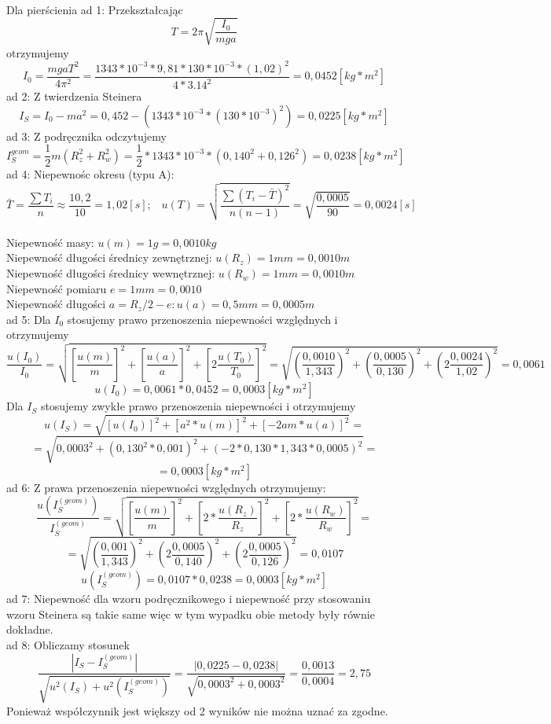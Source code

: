 \documentclass[a4paper,10pt,twoside]{article}
\begin{document}
\noindent
\\Dla pierścienia
\noindent
ad 1: Przekształcając 
$$
T = 2\pi\sqrt{\frac{I_0}{mga}}
$$
otrzymujemy
$$
I_0 = \frac{mgaT^2}{4\pi^2} = \frac{1343 * 10^{-3} * 9,81 * 130 * 10^{-3} * (1,02)^2}{4*3.14^2} = 0,0452[kg*m^2]
$$
ad 2: Z twierdzenia Steinera 
$$
I_S = I_0 - ma^2 = 0,452 - (1343*10^{-3}*(130*10^{-3})^2) = 0,0225[kg*m^2]
$$
ad 3: Z podręcznika odczytujemy $$I_S^{geom} = \frac{1}{2}m(R_z^2+ R_w^2) = \frac{1}{2}*1343*10^{-3}*(0,140^2 + 0,126^2) = 0,0238[kg*m^2]
$$
ad 4: Niepewnośc okresu (typu A): $$\bar{T} = \frac{\sum T_i}{n} \approx \frac{10,2}{10} = 1,02[s] ;\hspace{10pt} u(T) = \sqrt{\frac{\sum (T_i - \bar{T})^2}{n(n-1)}} = \sqrt{\frac{0,0005}{90}} = 0,0024[s] 
$$
\\ Niepewność masy: $u(m) = 1 g = 0,0010 kg$ 
\\ Niepewność długości średnicy zewnętrznej: $u(R_z) = 1 mm = 0,0010 m$
\\ Niepewność długości średnicy wewnętrznej:
 $u(R_w) = 1 mm = 0,0010 m$
\\Niepewność pomiaru $e = 1mm = 0,0010$
\\ Niepewność długości $a = R_z/2 - e: u(a) = 0,5mm = 0,0005 m$
\\ad 5: Dla $I_0$ stosujemy prawo przenoszenia niepewności względnych i otrzymujemy 
$$
\frac{u(I_0)}{I_0} = \sqrt{\left[\frac{u(m)}{m}\right]^2 + \left[\frac{u(a)}{a}\right]^2 + \left[2\frac{u(T_0)}{T_0}\right]^2} = \sqrt{\left(\frac{0,0010}{1,343}\right)^2 + \left(\frac{0,0005}{0,130}\right)^2 + \left(2\frac{0,0024}{1,02}\right)^2} = 0,0061
$$
$$
u(I_0) = 0,0061 * 0,0452 = 0,0003[kg * m^2]
$$
Dla $I_S$ stosujemy zwykłe prawo przenoszenia niepewności i otrzymujemy 
$$
u(I_S) = \sqrt{[u(I_0)]^2 + [a^2 * u(m)]^2 + [-2 am * u(a)]^2} =$$ $$= \sqrt{0,0003^2 + (0,130^2 * 0,001)^2 + (-2*0,130*1,343*0,0005)^2} = $$
$$ = 0,0003[kg * m^2]
$$
ad 6: Z prawa przenoszenia niepewności względnych otrzymujemy:
$$
\frac{u(I_S^{(geom)})}{I_S^{(geom)}} = \sqrt{\left[\frac{u(m)}{m}\right]^2 + \left[2*\frac{u(R_z)}{R_z}\right]^2 + \left[2*\frac{u(R_w)}{R_w}\right]^2}=$$ $$ = \sqrt{\left(\frac{0,001}{1,343}\right)^2 + \left(2\frac{0,0005}{0,140}\right)^2 + \left(2\frac{0,0005}{0,126}\right)^2} = 0,0107$$
$$
u(I_S^{(geom)}) = 0,0107 * 0,0238 = 0,0003[kg*m^2]
$$
ad 7: Niepewność dla wzoru podręcznikowego i niepewność przy stosowaniu wzoru Steinera 
są takie same więc w tym wypadku obie metody były równie dokładne.
\\ad 8: Obliczamy stosunek
$$
\frac{|I_S - I_S^{(geom)}|}{\sqrt{u^2(I_S) +  u^2(I_S^{(geom)})}} = \frac{|0,0225 - 0,0238|}{\sqrt{0,0003^2 + 0,0003^2}} = \frac{0,0013}{0,0004} = 2,75
$$
Ponieważ współczynnik jest większy od 2 wyników nie można uznać za zgodne.
\end{document}
